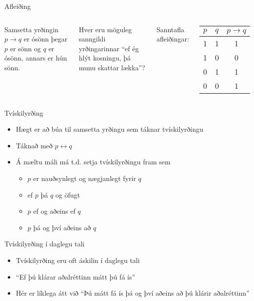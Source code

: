 \documentclass{beamer}
\begin{document}
\begin{frame}{Afleiðing}
\begin{columns}
Samsetta yrðingin $p \to q$ er ósönn þegar $p$ er sönn og $q$ er ósönn, annars er hún sönn.

\vspace*{0.5cm}

Hver eru möguleg sanngildi yrðingarinnar ``ef ég hlýt kosningu, þá munu skattar lækka''?

Sanntafla afleiðingar:
\begin{center}
\begin{tabular}{ccc}
\toprule
$p$&$q$&$p \to q$ \\
\midrule
1&1&1\\
1&0&0\\
0&1&1\\
0&0&1\\
\bottomrule
\end{tabular}
\end{center}
\end{columns}
\end{frame}

\begin{frame}{Tvískilyrðing}
\begin{itemize}
 \item Hægt er að búa til samsetta yrðingu sem táknar tvískilyrðingu
 \item Táknað með $p \leftrightarrow q$
 \item Á mæltu máli má t.d. setja tvískilyrðingu fram sem
 \begin{itemize}
  \item $p$ er nauðsynlegt og nægjanlegt fyrir $q$
  \item ef $p$ þá $q$ og öfugt
  \item $p$ ef og aðeins ef $q$
  \item $p$ þá og því aðeins að $q$
 \end{itemize}
\end{itemize}
\end{frame}

\begin{frame}{Tvískilyrðing í daglegu tali}
\begin{itemize}
 \item Tvískilyrðing eru oft áskilin í daglegu tali
 \item ``Ef þú klárar aðalréttinn mátt þú fá ís'' \pause
 \item Hér er líklega átt við ``Þú mátt fá ís þá og því aðeins að þú klárir aðalréttinn''
\end{itemize}
\end{frame}
\end{document}
